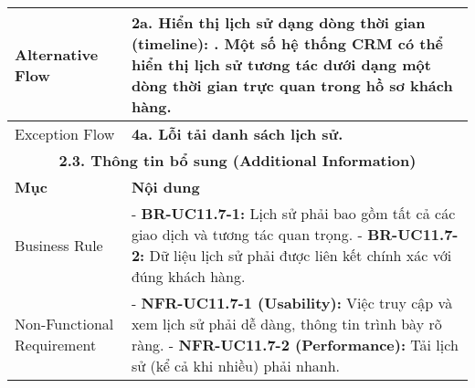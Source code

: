 \begin{longtable}{|m{4cm}|p{11cm}|}
\hline
Alternative Flow & \textbf{2a. Hiển thị lịch sử dạng dòng thời gian (timeline):} \newline    1. Một số hệ thống CRM có thể hiển thị lịch sử tương tác dưới dạng một dòng thời gian trực quan trong hồ sơ khách hàng. \\
\hline
Exception Flow & \textbf{4a. Lỗi tải danh sách lịch sử.} \\
\hline
\multicolumn{2}{|c|}{\textbf{2.3. Thông tin bổ sung (Additional Information)}} \\
\hline
\textbf{Mục} & \textbf{Nội dung} \\
\hline
Business Rule & - \textbf{BR-UC11.7-1:} Lịch sử phải bao gồm tất cả các giao dịch và tương tác quan trọng. \newline - \textbf{BR-UC11.7-2:} Dữ liệu lịch sử phải được liên kết chính xác với đúng khách hàng. \\
\hline
Non-Functional Requirement & - \textbf{NFR-UC11.7-1 (Usability):} Việc truy cập và xem lịch sử phải dễ dàng, thông tin trình bày rõ ràng. \newline - \textbf{NFR-UC11.7-2 (Performance):} Tải lịch sử (kể cả khi nhiều) phải nhanh. \\
\hline
\end{longtable}

